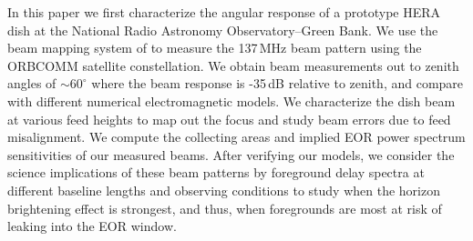 
In this paper we first characterize the angular response of a prototype HERA dish at the National Radio 
Astronomy Observatory--Green Bank. We use the beam mapping system of \citet{neben15} to 
measure the 137\,MHz beam pattern using the ORBCOMM satellite constellation. We obtain beam 
measurements out to zenith angles of $\sim60^\circ$ where the beam response is -35\,dB relative to zenith, and compare with different numerical electromagnetic models. We characterize the dish beam at various feed heights to map out the focus and study beam errors due to feed misalignment. We compute the collecting areas and implied EOR power spectrum sensitivities of our measured beams. After verifying our models, we consider the science implications of these 
beam patterns by foreground delay spectra at different baseline lengths and observing conditions to study when the horizon brightening effect is strongest, and thus, when foregrounds are most at risk of leaking into the EOR window.

